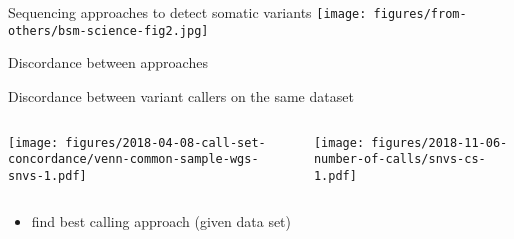 \documentclass{beamer}
\begin{document}
\begin{frame}{Sequencing approaches to detect somatic variants}
\texttt{[image: figures/from-others/bsm-science-fig2.jpg]}
\end{frame}

\begin{frame}{Discordance between approaches}

\end{frame}

\begin{frame}{Discordance between variant callers on the same dataset}

\begin{columns}[t]
\begin{column}{0.5\textwidth}

\texttt{[image: figures/2018-04-08-call-set-concordance/venn-common-sample-wgs-snvs-1.pdf]}
\end{column}

\begin{column}{0.5\textwidth}

\texttt{[image: figures/2018-11-06-number-of-calls/snvs-cs-1.pdf]}
\end{column}
\end{columns}
\end{frame}

\begin{frame}
\begin{itemize}
\item find best calling approach (given data set)
\end{itemize}
\end{frame}
\end{document}
